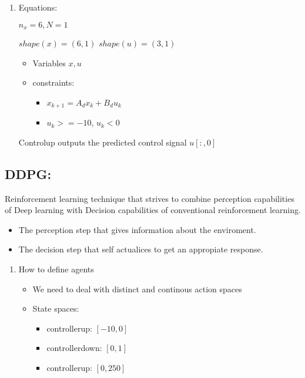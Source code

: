 \documentclass[11pt]{article}
\begin{document}
\begin{enumerate}
\item Equations:
\label{sec:org3a49717}

\(n_x = 6, N = 1\)

\(shape(x) = (6, 1)\)
\(shape(u) = (3, 1)\)

\begin{itemize}
    \item Variables $x, u$
    \item constraints:
    \begin{itemize}
        \item $x_{k+1} = A_d x_k + B_d u_k$
        \item $u_k >= -10$, $u_k<0$
    \end{itemize}
\end{itemize}

Controlup outputs the predicted control signal \(u[:,0]\)

\end{enumerate}

\subsection{DDPG:}
\label{sec:org3aa477f}
Reinforcement learning technique that strives to combine perception capabilities of Deep learning with Decision capabilities of conventional reinforcement learning.

\begin{itemize}
    \item The perception step that gives information about the enviroment.
    \item The decision step that self actualices to get an appropiate response.
\end{itemize}

\begin{enumerate}
\item How to define agents
\label{sec:org089b7c5}

\begin{itemize}
    \item We need to deal with distinct and continous action spaces
    \item State spaces:

    \begin{itemize}
        \item controllerup: $[-10, 0]$
        \item controllerdown: $[0, 1]$
        \item controllerup: $[0, 250]$
    \end{itemize}
\end{itemize}
\end{enumerate}
\end{document}
